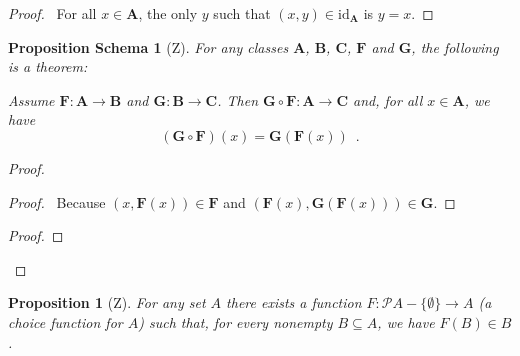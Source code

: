 \documentclass{book}
\let\qed\relax
\newtheorem{prop}[ax]{Proposition}
\newtheorem{props}[ax]{Proposition Schema}
\theoremstyle{definition}
\begin{document}
\begin{proof}
\pf\ For all $x \in \mathbf{A}$, the only $y$ such that $(x,y) \in \mathrm{id}_\mathbf{A}$ is $y = x$. \qed
\end{proof}

\begin{props}[Z]
For any classes $\mathbf{A}$, $\mathbf{B}$, $\mathbf{C}$, $\mathbf{F}$ and $\mathbf{G}$, the following is a theorem:

Assume $\mathbf{F} : \mathbf{A} \rightarrow \mathbf{B}$ and $\mathbf{G} : \mathbf{B} \rightarrow \mathbf{C}$. Then $\mathbf{G} \circ \mathbf{F} : \mathbf{A} \rightarrow \mathbf{C}$ and, for all $x \in \mathbf{A}$, we have
\[ (\mathbf{G} \circ \mathbf{F})(x) = \mathbf{G}(\mathbf{F}(x)) \enspace . \]
\end{props}

\begin{proof}
\pf
{}
\begin{proof}
	\pf\ Because $(x, \mathbf{F}(x)) \in \mathbf{F}$ and $(\mathbf{F}(x), \mathbf{G}(\mathbf{F}(x))) \in \mathbf{G}$.
\end{proof}
\begin{proof}
\end{proof}
\qed
\end{proof}

\begin{prop}[Z]
For any set $A$ there exists a function $F : \mathcal{P} A - \{ \emptyset \} \rightarrow A$ (a \emph{choice function} for $A$) such that, for every nonempty $B \subseteq A$, we have $F(B) \in B$.
\end{prop}
\end{document}
